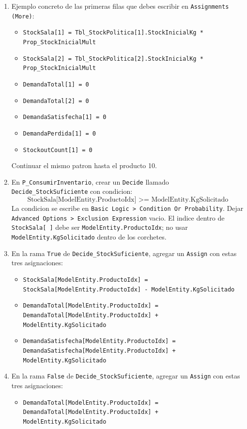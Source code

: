 \documentclass[11pt]{article}
\newcommand{\simio}[1]{\texttt{#1}}
\newcommand{\state}[1]{\texttt{#1}}
\newcommand{\proc}[1]{\texttt{#1}}
\begin{document}
\begin{enumerate}[resume]
  \item Ejemplo concreto de las primeras filas que debes escribir en \simio{Assignments (More)}:
  \begin{itemize}
    \item \state{StockSala[1] = Tbl\_StockPolitica[1].StockInicialKg * Prop\_StockInicialMult}
    \item \state{StockSala[2] = Tbl\_StockPolitica[2].StockInicialKg * Prop\_StockInicialMult}
    \item \state{DemandaTotal[1] = 0}
    \item \state{DemandaTotal[2] = 0}
    \item \state{DemandaSatisfecha[1] = 0}
    \item \state{DemandaPerdida[1] = 0}
    \item \state{StockoutCount[1] = 0}
  \end{itemize}
  Continuar el mismo patron hasta el producto 10.
  \item En \proc{P\_ConsumirInventario}, crear un \simio{Decide} llamado \simio{Decide\_StockSuficiente} con condicion:
  \[
  \text{StockSala[ModelEntity.ProductoIdx] >= ModelEntity.KgSolicitado}
  \]
  La condicion se escribe en \simio{Basic Logic > Condition Or Probability}. Dejar \simio{Advanced Options > Exclusion Expression} vacio. El indice dentro de \state{StockSala[ ]} debe ser \state{ModelEntity.ProductoIdx}; no usar \state{ModelEntity.KgSolicitado} dentro de los corchetes.
  \item En la rama \simio{True} de \simio{Decide\_StockSuficiente}, agregar un \simio{Assign} con estas tres asignaciones:
  \begin{itemize}
    \item \state{StockSala[ModelEntity.ProductoIdx] = StockSala[ModelEntity.ProductoIdx] - ModelEntity.KgSolicitado}
    \item \state{DemandaTotal[ModelEntity.ProductoIdx] = DemandaTotal[ModelEntity.ProductoIdx] + ModelEntity.KgSolicitado}
    \item \state{DemandaSatisfecha[ModelEntity.ProductoIdx] = DemandaSatisfecha[ModelEntity.ProductoIdx] + ModelEntity.KgSolicitado}
  \end{itemize}
  \item En la rama \simio{False} de \simio{Decide\_StockSuficiente}, agregar un \simio{Assign} con estas tres asignaciones:
  \begin{itemize}
    \item \state{DemandaTotal[ModelEntity.ProductoIdx] = DemandaTotal[ModelEntity.ProductoIdx] + ModelEntity.KgSolicitado}

\end{itemize}
\end{enumerate}
\end{document}

